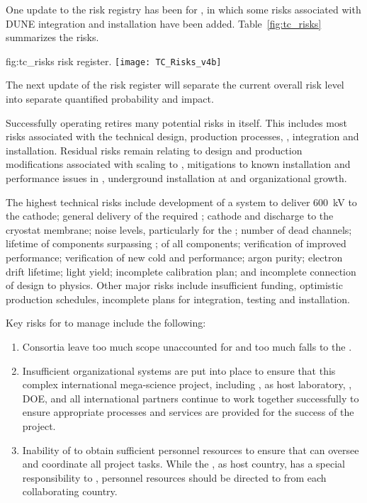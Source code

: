 One update to the risk registry has been for , in which some
risks  associated with  DUNE  integration and  installation have  been
added. Table~\ref{fig:tc_risks} summarizes the  risks.
\begin{dunefigure}{fig:tc_risks}
  { risk register.}
  \texttt{[image: TC\_Risks\_v4b]}
\end{dunefigure}

The next update of the risk register will separate the current overall
risk level into separate quantified probability and impact.

Successfully operating  retires many
potential risks in  itself. This includes most risks associated with the
technical design, production processes, , integration
and installation. Residual risks remain relating to design and
production modifications associated with scaling to , mitigations
to known installation and performance issues in , underground
installation at \surf and organizational growth.

The highest technical risks include development of a system to
deliver \SI{600}{kV} to the \dual cathode; general delivery of the
required ; cathode and  discharge to the cryostat
membrane; noise levels, particularly for the ; %
number of dead channels; lifetime of components surpassing \dunelifetime{}; %
 of all components; verification of improved 
performance; verification of new cold   and   performance;
argon purity; electron drift lifetime; \phel light yield;
incomplete calibration plan; and incomplete connection of design to
physics. Other major risks include insufficient funding, optimistic
production schedules, incomplete plans for integration, testing and installation.

Key risks for  to manage include the following:
\begin{enumerate}
\item Consortia leave too much scope unaccounted for and too much falls
  to  the .
\item Insufficient organizational systems are put into place to
  ensure that this complex international mega-science project,
  including , \fnal as host laboratory, \surf, DOE, and all international
  partners continue to work together successfully to ensure
  appropriate processes and services are provided for the success of
  the project.
\item Inability of  to obtain sufficient personnel resources to
  ensure that  can oversee and coordinate all project tasks.  While the , 
  as host country, has a special responsibility to , personnel resources should
  be directed to  from each collaborating country. 
\end{enumerate}

